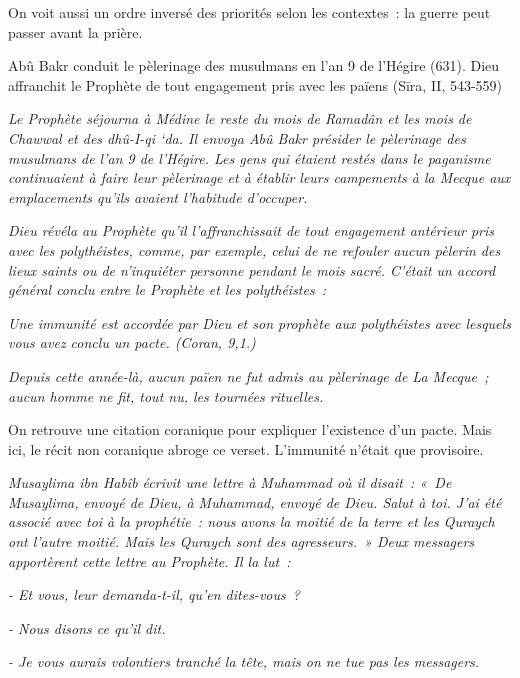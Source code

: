 On voit aussi un ordre inversé des priorités selon les contextes~: la
guerre peut passer avant la prière.

Abû Bakr conduit le pèlerinage des musulmans en l'an 9 de l'Hégire
(631). Dieu affranchit le Prophète de tout engagement pris avec les
païens (Sīra, II, 543-559)

\emph{Le Prophète séjourna à Médine le reste du mois de Ramadân et les
mois de Chawwal et des dhû-I-qi `da. Il envoya Abû Bakr présider le
pèlerinage des musulmans de l'an 9 de l'Hégire. Les gens qui étaient
restés dans le paganisme continuaient à faire leur pèlerinage et à
établir leurs campements à la Mecque aux emplacements qu'ils avaient
l'habitude d'occuper.}

\emph{Dieu révéla au Prophète qu'il l'affranchissait de tout engagement
antérieur pris avec les polythéistes, comme, par exemple, celui de ne
refouler aucun pèlerin des lieux saints ou de n'inquiéter personne
pendant le mois sacré. C'était un accord général conclu entre le
Prophète et les polythéistes~:}

\emph{Une immunité est accordée par Dieu et son prophète aux
polythéistes avec lesquels vous avez conclu un pacte. (Coran, 9,1.)}

\emph{Depuis cette année-là, aucun païen ne fut admis au pèlerinage de
La Mecque~; aucun homme ne fit, tout nu, les tournées rituelles.}

On retrouve une citation coranique pour expliquer l'existence d'un
pacte. Mais ici, le récit non coranique abroge ce verset. L'immunité
n'était que provisoire.


\emph{Musaylima ibn Habîb écrivit une lettre à Muhammad où il disait~:
«~De Musaylima, envoyé de Dieu, à Muhammad, envoyé de Dieu. Salut à toi.
J'ai été associé avec toi à la prophétie~: nous avons la moitié de la
terre et les Quraych ont l'autre moitié. Mais les Quraych sont des
agresseurs.~» Deux messagers apportèrent cette lettre au Prophète. Il la
lut~:}

\emph{- Et vous, leur demanda-t-il, qu'en dites-vous~?}

\emph{- Nous disons ce qu'il dit.}

\emph{- Je vous aurais volontiers tranché la tête, mais on ne tue pas
les messagers.}

